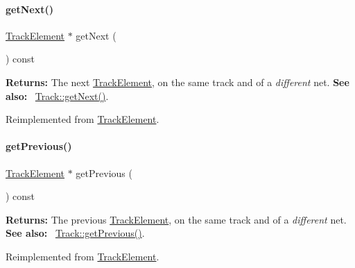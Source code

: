 \paragraph{\texorpdfstring{get\+Next()}{getNext()}}
{\footnotesize\ttfamily \hyperlink{classKite_1_1TrackElement}{Track\+Element} $\ast$ get\+Next (\begin{DoxyParamCaption}{ }\end{DoxyParamCaption}) const\hspace{0.3cm}{\ttfamily [virtual]}}

{\bfseries Returns\+:} The next \hyperlink{classKite_1_1TrackElement}{Track\+Element}, on the same track and of a {\itshape different} net. {\bfseries See also\+:}~ \hyperlink{classKite_1_1Track_af3db59591bef3c690ace92c114a4e4aa}{Track\+::get\+Next()}. 

Reimplemented from \hyperlink{classKite_1_1TrackElement_a010b7fc8801c5b88aefa4137cf85186d}{Track\+Element}.

\mbox{\label{classKite_1_1TrackSegment_a55d6115d84c11ad147f4c38fe372ea24}} 
\paragraph{\texorpdfstring{get\+Previous()}{getPrevious()}}
{\footnotesize\ttfamily \hyperlink{classKite_1_1TrackElement}{Track\+Element} $\ast$ get\+Previous (\begin{DoxyParamCaption}{ }\end{DoxyParamCaption}) const\hspace{0.3cm}{\ttfamily [virtual]}}

{\bfseries Returns\+:} The previous \hyperlink{classKite_1_1TrackElement}{Track\+Element}, on the same track and of a {\itshape different} net. {\bfseries See also\+:}~ \hyperlink{classKite_1_1Track_a290fcfe6131730d216951a3b5207d777}{Track\+::get\+Previous()}. 

Reimplemented from \hyperlink{classKite_1_1TrackElement_a55d6115d84c11ad147f4c38fe372ea24}{Track\+Element}.

\mbox{\label{classKite_1_1TrackSegment_a95ec3b8e7e1ec87c20ee0b37bcc96df7}} 
